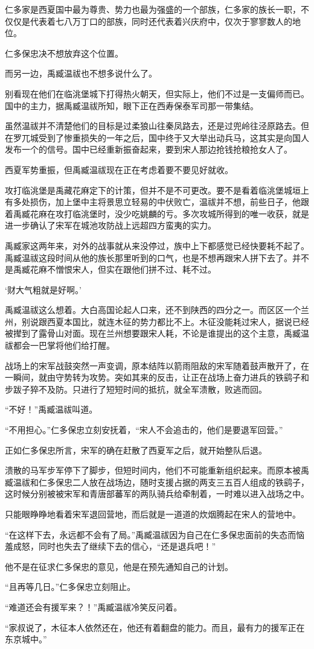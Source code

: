 仁多家是西夏国中最为尊贵、势力也最为强盛的一个部族，仁多家的族长一职，不仅仅是代表着七八万丁口的部族，同时还代表着兴庆府中，仅次于寥寥数人的地位。

仁多保忠决不想放弃这个位置。

而另一边，禹臧温祓也不想多说什么了。

别看现在他们在临洮堡城下打得热火朝天，但实际上，他们不过是一支偏师而已。国中的主力，据禹臧温祓所知，眼下正在西寿保泰军司那一带集结。

虽然温祓并不清楚他们的目标是过柔狼山往秦凤路去，还是过兜岭往泾原路去。但在罗兀城受到了惨重损失的一年之后，国中终于又大举出动兵马，这其实是向国人发布一个的信号。国中已经重新振奋起来，要到宋人那边抢钱抢粮抢女人了。

西夏军势重振，但禹臧温祓现在正在考虑着要不要见好就收。

攻打临洮堡是禹藏花麻定下的计策，但并不是不可更改。要不是看着临洮堡城垣上有多处损伤，加上堡中主将景思立轻易的中伏败亡，温祓并不想，前些日子，他跟着禹臧花麻在攻打临洮堡时，没少吃姚麟的亏。多次攻城所得到的唯一收获，就是进一步确认了宋军在城池攻防战上远超四方蛮夷的实力。

禹臧家这两年来，对外的战事就从来没停过，族中上下都感觉已经快要耗不起了。禹臧温祓这段时间从他的族长那里听到的口气，也是不想再跟宋人拼下去了。并不是禹臧花麻不憎恨宋人，但实在跟他们拼不过、耗不过。

‘财大气粗就是好啊。’

禹臧温祓这么想着。大白高国论起人口来，还不到陕西的四分之一。而区区一个兰州，别说跟西夏本国比，就连木征的势力都比不上。木征没能耗过宋人，据说已经被撵到了露骨山对面。现在兰州想要跟宋人耗，不论是谁提出的这个主意，禹臧温祓都会一巴掌将他们给打醒。

战场上的宋军战鼓突然一声变调，原本结阵以箭雨阻敌的宋军随着鼓声散开了，在一瞬间，就由守势转为攻势。突如其来的反击，让正在战场上奋力进兵的铁鹞子和步跋子猝不及防。只进行了短短时间的抵抗，就全军溃散，败逃而回。

“不好！”禹臧温祓叫道。

“不用担心。”仁多保忠立刻安抚着，“宋人不会追击的，他们是要退军回营。”

正如仁多保忠所言，宋军的确在赶散了西夏军之后，就开始整队后退。

溃散的马军步军停下了脚步，但短时间内，他们不可能重新组织起来。而原本被禹臧温祓和仁多保忠二人放在战场边，随时支援占据的两支三五百人组成的铁鹞子，这时候分别被被宋军和青唐部蕃军的两队骑兵给牵制着，一时难以进入战场之中。

只能眼睁睁地看着宋军退回营地，而后就是一道道的炊烟腾起在宋人的营地中。

“在这样下去，永远都不会有了局。”禹臧温祓因为自己在仁多保忠面前的失态而恼羞成怒，同时也失去了继续下去的信心，“还是退兵吧！”

他不是在征求仁多保忠的意见，他是在预先通知自己的计划。

“且再等几日。”仁多保忠立刻阻止。

“难道还会有援军来？！”禹臧温祓冷笑反问着。

“家叔说了，木征本人依然还在，他还有着翻盘的能力。而且，最有力的援军正在东京城中。”

